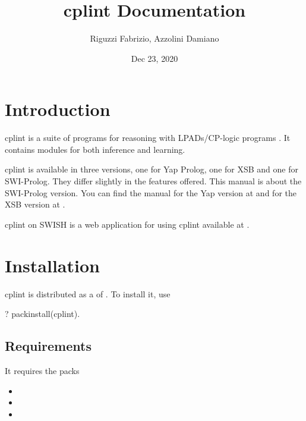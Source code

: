 \documentclass[letterpaper,10pt,english]{sphinxmanual}
\title{cplint Documentation}
\date{Dec 23, 2020}
\author{Riguzzi Fabrizio, Azzolini Damiano}
\begin{document}
\pagestyle{empty}
\sphinxmaketitle
\pagestyle{plain}
\sphinxtableofcontents
\pagestyle{normal}
\label{\detokenize{index::doc}}



\chapter{Introduction}
\label{\detokenize{index:introduction}}
cplint is a suite of programs for reasoning with LPADs/CP-logic programs .
It contains modules for both inference and learning.

cplint is available in three versions, one for Yap Prolog, one for XSB and one for SWI-Prolog.
They differ slightly in the features offered.
This manual is about the SWI-Prolog version.
You can find the manual for the Yap version at  and
for the XSB version at .

cplint on SWISH is a web application for using cplint available at .


\chapter{Installation}
\label{\detokenize{index:installation}}
cplint is distributed as a  of .
To install it, use

\begin{sphinxVerbatim}[commandchars=\\\{\}]
?\PYGZhy{} pack\PYGZus{}install(cplint).
\end{sphinxVerbatim}


\section{Requirements}
\label{\detokenize{index:requirements}}
It requires the packs
\begin{itemize}
\item {} 

\item {} 

\item {} 

\end{itemize}
\end{document}
